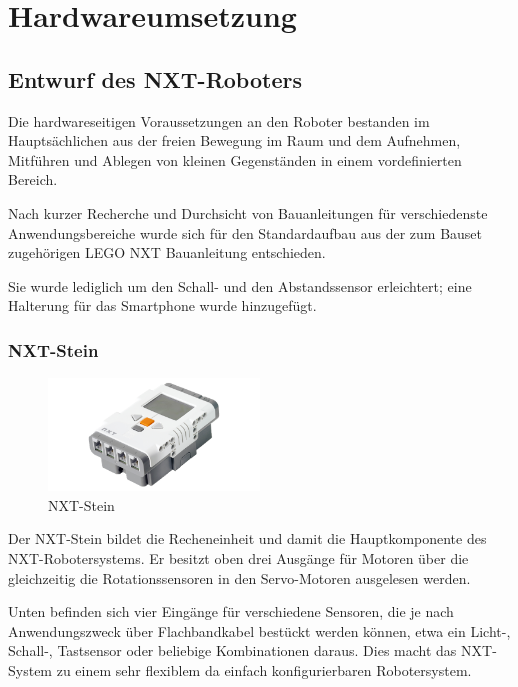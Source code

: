 \chapter{Hardwareumsetzung}
\label{cha:robot}
\section{Entwurf des NXT-Roboters}

Die hardwareseitigen Voraussetzungen an den Roboter bestanden im Hauptsächlichen aus der freien Bewegung im Raum und dem Aufnehmen, Mitführen und Ablegen von kleinen Gegenständen in einem vordefinierten Bereich.

Nach kurzer Recherche\cite{building_instructions} und Durchsicht von Bauanleitungen für verschiedenste Anwendungsbereiche wurde sich für den Standardaufbau aus der zum Bauset zugehörigen LEGO NXT Bauanleitung entschieden.

Sie wurde lediglich um den Schall- und den Abstandssensor erleichtert; eine Halterung für das Smartphone wurde hinzugefügt.


\pagebreak

\subsection{NXT-Stein}

\begin{figure}[h]
\centering
\includegraphics[width=0.5\textwidth]{Bilder/Robot/nxt_brick}
\caption{NXT-Stein}
\label{fig:nxtBrick}
\end{figure}

Der NXT-Stein bildet die Recheneinheit und damit die Hauptkomponente des NXT-Robotersystems. Er besitzt oben drei Ausgänge für Motoren über die gleichzeitig die Rotationssensoren in den Servo-Motoren ausgelesen werden.

Unten befinden sich vier Eingänge für verschiedene Sensoren, die je nach Anwendungszweck über Flachbandkabel bestückt werden können, etwa ein Licht-, Schall-, Tastsensor oder beliebige Kombinationen daraus. Dies macht das NXT-System zu einem sehr flexiblem da einfach konfigurierbaren Robotersystem.

